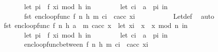 \begin{isabellebody}
\ \ \ \ \ \ \ \ let\ p{\isacharunderscore}{\kern0pt}i\ {\isacharequal}{\kern0pt}\ f\ {\isacharparenleft}{\kern0pt}x{\isacharunderscore}{\kern0pt}i\ mod\ {}{\isacharcircum}{\kern0pt}h{\isacharparenright}{\kern0pt}\ in\isanewline
\ \ \ \ \ \ \ \ let\ c{\isacharunderscore}{\kern0pt}i\ {\isacharequal}{\kern0pt}\ a\ {\isacharbrackleft}{\kern0pt}{\isasymoplus}{\isacharbrackright}{\kern0pt}\ p{\isacharunderscore}{\kern0pt}i\ in\isanewline
\ \ \ \ \ \ \ \ fst\ {\isacharparenleft}{\kern0pt}enc{\isacharunderscore}{\kern0pt}loop{\isacharunderscore}{\kern0pt}func\ {\isacharparenleft}{\kern0pt}f{\isacharcomma}{\kern0pt}\ n{\isacharcomma}{\kern0pt}\ h{\isacharcomma}{\kern0pt}\ m{\isacharparenright}{\kern0pt}\ {\isacharparenleft}{\kern0pt}c{\isacharunderscore}{\kern0pt}i\ {\isacharhash}{\kern0pt}\ c{\isacharunderscore}{\kern0pt}acc{\isacharparenright}{\kern0pt}\ x{\isacharunderscore}{\kern0pt}i{\isacharparenright}{\kern0pt}\isanewline
\ \ \ \ \ \ \ \ {\isacharparenright}{\kern0pt}{\isachardoublequoteclose}\ \isamarkupfalse%
\ Let{\isacharunderscore}{\kern0pt}def\ \isamarkupfalse%
\ auto\isanewline
\ \ \isamarkupfalse%
\ \isamarkupfalse%
\ \ {\isachardoublequoteopen}fst\ {\isacharparenleft}{\kern0pt}enc{\isacharunderscore}{\kern0pt}loop{\isacharunderscore}{\kern0pt}func\ {\isacharparenleft}{\kern0pt}f{\isacharcomma}{\kern0pt}\ n{\isacharcomma}{\kern0pt}\ h{\isacharcomma}{\kern0pt}\ {\isacharparenleft}{\kern0pt}a\ {\isacharhash}{\kern0pt}\ m{\isacharparenright}{\kern0pt}{\isacharparenright}{\kern0pt}\ c{\isacharunderscore}{\kern0pt}acc\ x{\isacharparenright}{\kern0pt}\ {\isacharequal}{\kern0pt}\ {\isacharparenleft}{\kern0pt}let\ x{\isacharunderscore}{\kern0pt}i\ {\isacharequal}{\kern0pt}\ x\ {\isacharasterisk}{\kern0pt}\ x\ mod\ n\ in\isanewline
\ \ \ \ \ \ \ \ let\ p{\isacharunderscore}{\kern0pt}i\ {\isacharequal}{\kern0pt}\ f\ {\isacharparenleft}{\kern0pt}x{\isacharunderscore}{\kern0pt}i\ mod\ {}{\isacharcircum}{\kern0pt}h{\isacharparenright}{\kern0pt}\ in\isanewline
\ \ \ \ \ \ \ \ let\ c{\isacharunderscore}{\kern0pt}i\ {\isacharequal}{\kern0pt}\ a\ {\isacharbrackleft}{\kern0pt}{\isasymoplus}{\isacharbrackright}{\kern0pt}\ p{\isacharunderscore}{\kern0pt}i\ in\isanewline
\ \ \ \ \ \ \ \ enc{\isacharunderscore}{\kern0pt}loop{\isacharunderscore}{\kern0pt}func{\isacharunderscore}{\kern0pt}between\ {\isacharparenleft}{\kern0pt}f{\isacharcomma}{\kern0pt}\ n{\isacharcomma}{\kern0pt}\ h{\isacharcomma}{\kern0pt}\ m{\isacharparenright}{\kern0pt}\ {\isacharparenleft}{\kern0pt}c{\isacharunderscore}{\kern0pt}i\ {\isacharhash}{\kern0pt}\ c{\isacharunderscore}{\kern0pt}acc{\isacharparenright}{\kern0pt}\ x{\isacharunderscore}{\kern0pt}i\isanewline

\end{isabellebody}
